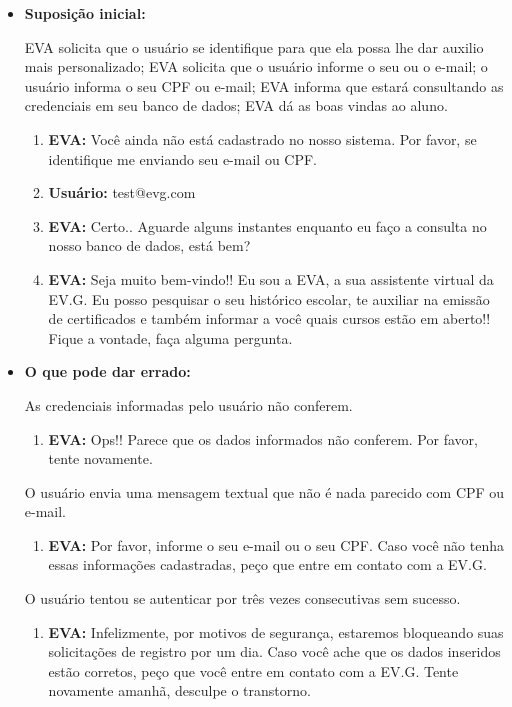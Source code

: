 \begin{itemize}
    \item \textbf{Suposição inicial:} 
    
        EVA solicita que o usuário se identifique para que ela possa lhe dar auxilio mais personalizado; EVA solicita que o usuário informe o seu  ou o e-mail; o usuário informa o seu CPF ou e-mail; EVA informa que estará consultando as credenciais em seu banco de dados; EVA dá as boas vindas ao aluno.
        
        \begin{enumerate}
            \item \textbf{EVA:} Você ainda não está cadastrado no nosso sistema. Por favor, se identifique me enviando seu e-mail ou CPF.
            \item \textbf{Usuário:} test@evg.com
            \item \textbf{EVA:} Certo.. Aguarde alguns instantes enquanto eu faço a consulta no nosso banco de dados, está bem?
            \item \textbf{EVA:} Seja muito bem-vindo!! Eu sou a EVA, a sua assistente virtual da EV.G. Eu posso pesquisar o seu histórico escolar, te auxiliar na emissão de certificados e também informar a você quais cursos estão em aberto!! Fique a vontade, faça alguma pergunta.
        \end{enumerate}
    
    \item \textbf{O que pode dar errado:}
    
        As credenciais informadas pelo usuário não conferem.
        \begin{enumerate}
            \item \textbf{EVA:} Ops!! Parece que os dados informados não conferem. Por favor, tente novamente.
        \end{enumerate}
        
        O usuário envia uma mensagem textual que não é nada parecido com CPF ou e-mail.
        \begin{enumerate}
            \item \textbf{EVA:} Por favor, informe o seu e-mail ou o seu CPF. Caso você não tenha essas informações cadastradas, peço que entre em contato com a EV.G.
        \end{enumerate}
        
        O usuário tentou se autenticar por três vezes consecutivas sem sucesso.
        \begin{enumerate}
            \item \textbf{EVA:} Infelizmente, por motivos de segurança, estaremos bloqueando suas solicitações de registro por um dia. Caso você ache que os dados inseridos estão corretos, peço que você entre em contato com a EV.G. Tente novamente amanhã, desculpe o transtorno.
        \end{enumerate}
        

\end{itemize}
